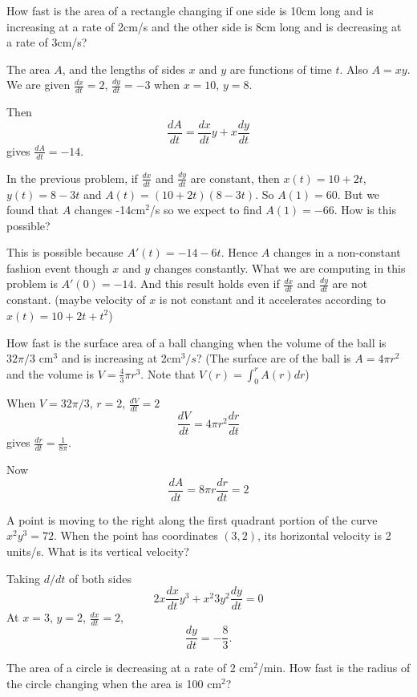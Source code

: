 \documentclass[../main.tex]{subfiles}
\begin{document}
\begin{example}
  How fast is the area of a rectangle changing if one side is 10cm long and is increasing at a rate of 2cm/s and the other side is 8cm long and is decreasing at a rate of 3cm/s?
\end{example}
\begin{solution}
  The area $A$, and the lengths of sides $x$ and $y$ are functions of time $t$. Also $A = x y$. We are given $\frac{dx}{dt} = 2$, $\frac{dy}{dt} = -3$ when $x=10$, $y=8$.

  Then
  \[
    \frac{dA}{dt} = \frac{dx}{dt} y + x \frac{dy}{dt}
  \]
  gives $\frac{dA}{dt} = -14$.
\end{solution}
In the previous problem, if $\frac{dx}{dt}$ and $\frac{dy}{dt}$ are constant, then $x(t) = 10 + 2t$, $y(t) = 8-3t$ and $A(t) = (10+2t)(8-3t)$. So $A(1) = 60$. But we found that $A$ changes -14cm$^2$/s so we expect to find $A(1)=-66$. How is this possible?

This is possible because $A'(t) = -14 - 6t$. Hence $A$ changes in a non-constant fashion event though $x$ and $y$ changes constantly. What we are computing in this problem is $A'(0) = - 14$. And this result holds even if $\frac{dx}{dt}$ and $\frac{dy}{dt}$ are not constant. (maybe velocity of $x$ is not constant and it accelerates according to $x(t) = 10 + 2t + t^2$)

\begin{example}
  How fast is the surface area of a ball changing when the volume of the ball is $32 \pi/3$ cm$^3$ and is increasing at 2cm$^3/s$? (The surface are of the ball is $A = 4\pi r^2$ and the volume is $V = \frac{4}{3} \pi r^3$. Note that $V(r) = \int_0^r A(r) dr$)
\end{example}
\begin{solution}
  When $V=32 \pi/3$, $r=2$, $\frac{dV}{dt} = 2$
  \[
    \frac{dV}{dt} = 4 \pi r^2 \frac{dr}{dt}
  \]
  gives $\frac{dr}{dt} = \frac{1}{8 \pi}$.

  Now
  \[
    \frac{dA}{dt} = 8 \pi r \frac{dr}{dt} = 2
  \]
\end{solution}

\begin{example}
  A point is moving to the right along the first quadrant portion of the curve $x^2 y^3 = 72$. When the point has coordinates $(3,2)$, its horizontal velocity is 2 units/s. What is its vertical velocity?
\end{example}
\begin{solution}
  Taking $d/dt$ of both sides
  \[
    2x \frac{dx}{dt} y^3 + x^2 3 y^2 \frac{dy}{dt} = 0
  \]
  At $x=3$, $y=2$, $\frac{dx}{dt} = 2$,
  \[
    \frac{dy}{dt} = - \frac{8}{3}.
  \]

\end{solution}

\begin{example}
  The area of a circle is decreasing at a rate of 2 cm$^2$/min. How fast is the radius of the circle changing when the area is 100 cm$^2$?
\end{example}
\end{document}
